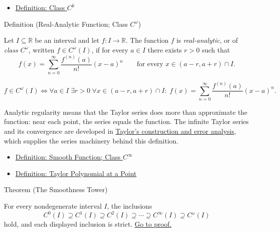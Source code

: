 \begin{dependencies}
\begin{itemize}
  \item \hyperref[def:class-ck]{Definition: Class \(C^k\)}
\end{itemize}
\end{dependencies}

\begin{definitionbox}{Definition (Real-Analytic Function; Class \(C^\omega\))}
\begin{definition}
\label{def:class-comega}
Let \(I\subseteq\mathbb{R}\) be an interval and let \(f:I\to\mathbb{R}\). The function \(f\) is \emph{real-analytic}, or of \emph{class \(C^\omega\)}, written \(f\in C^\omega(I)\), if for every \(a\in I\) there exists \(r>0\) such that
\[
  f(x)=\sum_{n=0}^{\infty}\frac{f^{(n)}(a)}{n!}(x-a)^n
  \qquad\text{for every }x\in(a-r,a+r)\cap I.
\]
\end{definition}
\end{definitionbox}

\begin{remark*}
\[
  f\in C^\omega(I)
  \Longleftrightarrow
  \forall a\in I\;\exists r>0\;\forall x\in(a-r,a+r)\cap I:\;
  f(x)=\sum_{n=0}^{\infty}\frac{f^{(n)}(a)}{n!}(x-a)^n.
\]
\end{remark*}

\begin{remark*}[Interpretation]
Analytic regularity means that the Taylor series does more than approximate the function: near each point, the series equals the function. The infinite Taylor series and its convergence are developed in \hyperref[def:taylor-polynomial-at-a-point]{Taylor's construction and error analysis}, which supplies the series machinery behind this definition.
\end{remark*}

\begin{dependencies}
\begin{itemize}
  \item \hyperref[def:class-cinfty]{Definition: Smooth Function; Class \(C^\infty\)}
  \item \hyperref[def:taylor-polynomial-at-a-point]{Definition: Taylor Polynomial at a Point}
\end{itemize}
\end{dependencies}

\begin{theorembox}{Theorem (The Smoothness Tower)}
\begin{theorem}
\label{thm:smoothness-tower}
For every nondegenerate interval \(I\), the inclusions
\[
  C^0(I)\supseteq C^1(I)\supseteq C^2(I)\supseteq \cdots
  \supseteq C^\infty(I)\supseteq C^\omega(I)
\]
hold, and each displayed inclusion is strict.
\hyperref[prf:smoothness-tower]{Go to proof.}
\end{theorem}
\end{theorembox}

